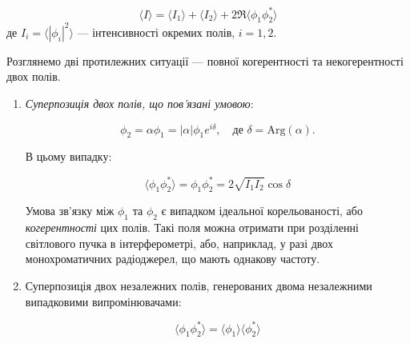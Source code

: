 \begin{equation}
	\langle I \rangle = \langle I_1 \rangle + \langle I_2 \rangle + 2 \Re \langle \phi_1 \phi_2^{*} \rangle
	\label{eq:intensity}
\end{equation}
%
де \( I_i = \langle |\phi_i|^2 \rangle \) --- інтенсивності окремих полів, \( i = 1, 2 \).

Розглянемо дві протилежних ситуації --- повної когерентності та некогерентності двох полів.

\begin{enumerate}
	\item \emph{Суперпозиція двох полів, що пов'язані умовою}:

	      \begin{equation*}
		      \phi_2 = \alpha \phi_1 = |\alpha| \phi_1 e^{i\delta}, \quad \text{де } \delta = \text{Arg}(\alpha).
	      \end{equation*}

	      В цьому випадку:

	      \begin{equation*}
		      \langle \phi_1 \phi_2^{*} \rangle = \phi_1 \phi_2^{*} = 2\sqrt{I_1 I_2} \cos \delta
	      \end{equation*}

	      Умова зв'язку між \(\phi_1\) та \(\phi_2\) є випадком ідеальної корельованості, або \emph{когерентності} цих
	      полів. Такі поля можна отримати при розділенні світлового пучка в інтерферометрі, або, наприклад, у разі двох
	      монохроматичних радіоджерел, що мають однакову частоту.

	\item Суперпозиція двох незалежних полів, генерованих двома незалежними випадковими випромінювачами:

	      \begin{equation*}
		      \langle \phi_1 \phi_2^{*} \rangle = \langle \phi_1 \rangle \langle \phi_2^{*} \rangle
	      \end{equation*}


\end{enumerate}

